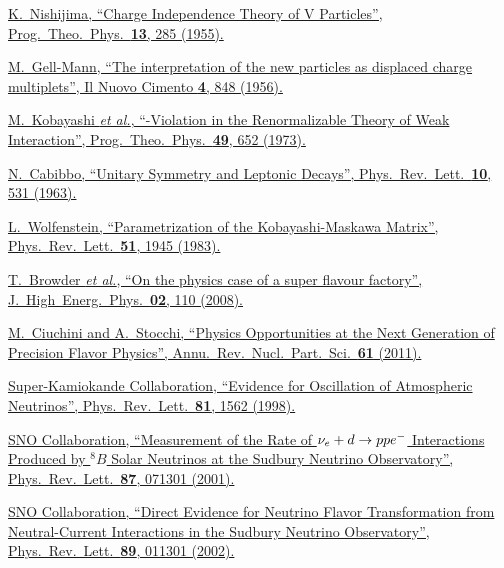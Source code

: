 {
\begin{thebibliography}{xxx}

	\href{https://doi.org/10.1143/PTP.13.285}{K.~Nishijima, \enquote{Charge Independence Theory of V Particles}, Prog.\ Theo.\ Phys.\ \textbf{13}, 285 (1955).}

	\href{https://doi.org/10.1007/BF02748000}{M.~Gell-Mann, \enquote{The interpretation of the new particles as displaced charge multiplets}, Il Nuovo Cimento \textbf{4}, 848 (1956).}

	\href{https://doi.org/10.1143/PTP.49.652}{M.~Kobayashi \textit{et al.}, \enquote{\CP-Violation in the Renormalizable Theory of Weak Interaction}, Prog.\ Theo.\ Phys.\ \textbf{49}, 652 (1973).}

	\href{https://doi.org/10.1103/PhysRevLett.10.531}{N.~Cabibbo, \enquote{Unitary Symmetry and Leptonic Decays}, Phys.\ Rev.\ Lett.\ \textbf{10}, 531 (1963).}

	\href{https://doi.org/10.1103/PhysRevLett.51.1945}{L.~Wolfenstein, \enquote{Parametrization of the Kobayashi-Maskawa Matrix}, Phys.\ Rev.\ Lett.\ \textbf{51}, 1945 (1983).}

	\href{https://doi.org/10.1088/1126-6708/2008/02/110}{T.~Browder \textit{et al.}, \enquote{On the physics case of a super flavour factory}, J.\ High\ Energ.\ Phys.\ \textbf{02}, 110 (2008).}

	\href{https://doi.org/10.1146/annurev-nucl-102010-130424}{M.~Ciuchini and A.~Stocchi, \enquote{Physics Opportunities at the Next Generation of Precision Flavor Physics}, Annu.\ Rev.\ Nucl.\ Part.\ Sci.\ \textbf{61} (2011).}

	\href{https://doi.org/10.1103/PhysRevLett.81.1562}{Super-Kamiokande Collaboration, \enquote{Evidence for Oscillation of Atmospheric Neutrinos}, Phys.\ Rev.\ Lett.\ \textbf{81}, 1562 (1998).}

	\href{https://doi.org/10.1103/PhysRevLett.87.071301}{SNO Collaboration, \enquote{Measurement of the Rate of ${{\nu}_e} + d \rightarrow {\ensuremath{p}} {\ensuremath{p}} {\ensuremath{e^-}}$ Interactions Produced by ${}^{8}\!B$ Solar Neutrinos at the Sudbury Neutrino Observatory}, Phys.\ Rev.\ Lett.\ \textbf{87}, 071301 (2001).}

	\href{https://doi.org/10.1103/PhysRevLett.89.011301}{SNO Collaboration, \enquote{Direct Evidence for Neutrino Flavor Transformation from Neutral-Current Interactions in the Sudbury Neutrino Observatory}, Phys.\ Rev.\ Lett.\ \textbf{89}, 011301 (2002).}


\end{thebibliography}}
